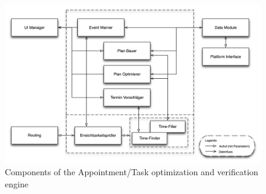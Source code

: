 \begin{figure}[h!]
\centering
\includegraphics[width=16cm]{pics/event_stuff.png}
\caption{Components of the Appointment/Task optimization and verification engine}
\label{event_stuff}
\end{figure}

